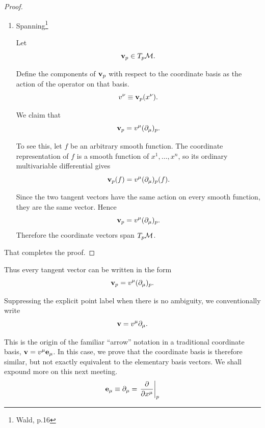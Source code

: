 \begin{proof}
\begin{enumerate}[(1)]
					Therefore the coordinate basis vectors are linearly independent.

				\item Spanning\footnote{Wald, p.16}

					Let
					\[
						\vb{v}_p\in T_p\mathcal{M}.
					\]

					Define the components of $\vb{v}_p$ with respect to the
					coordinate basis as the action of the operator on that basis.
					\begin{equation}
						v^\nu
						\equiv
						\vb{v}_p(x^\nu).
						\label{eq:vector-components}
					\end{equation}

					We claim that
					\begin{equation}
						\vb{v}_p
						=
						v^\mu(\partial_\mu)_p.
						\label{eq:vector-basis-expansion}
					\end{equation}

					To see this, let $f$ be an arbitrary smooth function. The
					coordinate representation of $f$ is a smooth function of
					$x^1,\ldots,x^n$, so its ordinary multivariable differential
					gives
					\begin{equation}
						\vb{v}_p(f)
						=
						v^\mu(\partial_\mu)_p(f).
						\label{eq:vector-acting-on-function}
					\end{equation}

					Since the two tangent vectors have the same action on every
					smooth function, they are the same vector. Hence
					\[
						\vb{v}_p
						=
						v^\mu(\partial_\mu)_p.
					\]
					Therefore the coordinate vectors span $T_p\mathcal{M}$.
			\end{enumerate}
			That completes the proof.
		\end{proof}

		Thus every tangent vector can be written in the form
		\begin{equation}
			\vb{v}_p
			=
			v^\mu(\partial_\mu)_p.
			\label{eq:vector-coordinate-expansion}
		\end{equation}

		Suppressing the explicit point label when there is no ambiguity,
		we conventionally write
		\begin{equation}
			\vb{v}
			=
			v^\mu\partial_\mu.
			\label{eq:abstract-vector-expansion}
		\end{equation}

		This is the origin of the familiar ``arrow'' notation in a traditional coordinate
		basis, $\vb{v} = v^\mu \vb{e}_\mu$. In this case, we prove that the coordinate
		basis is therefore similar, but not exactly equivalent to the elementary basis vectors. 
		We shall expound more on this next meeting.
		\[
			\vb{e}_\mu \equiv \partial_\mu = \eval{\pdv{}{x^\mu}}_{p}
		\]

